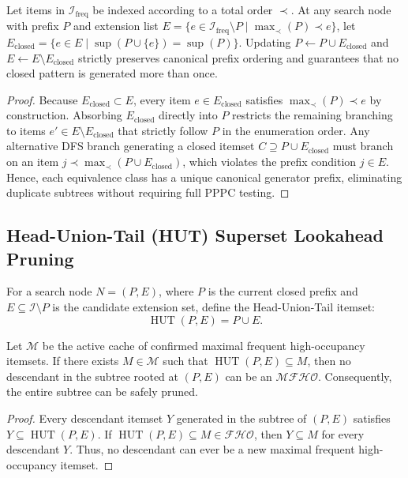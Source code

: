 \documentclass[runningheads,orivec]{llncs}
\newcommand{\supp}{\operatorname{sup}}
\newcommand{\HUT}{\operatorname{HUT}}
\newcommand{\FHO}{\ensuremath{\mathcal{FHO}}}
\newcommand{\MFHOI}{\ensuremath{\mathcal{MFHO}}}
\begin{document}
\begin{lemma}
\label{lem:canonical_closure}
Let items in $\mathcal{I}_{\text{freq}}$ be indexed according to a total order $\prec$.
At any search node with prefix $P$ and extension list $E = \{e \in \mathcal{I}_{\text{freq}} \setminus P \mid \max_{\prec}(P) \prec e\}$, let $E_{\mathrm{closed}} = \{e \in E \mid \supp(P \cup \{e\}) = \supp(P)\}$.
Updating $P \gets P \cup E_{\mathrm{closed}}$ and $E \gets E \setminus E_{\mathrm{closed}}$ strictly preserves canonical prefix ordering and guarantees that no closed pattern is generated more than once.
\end{lemma}
\begin{proof}
Because $E_{\mathrm{closed}} \subset E$, every item $e \in E_{\mathrm{closed}}$ satisfies $\max_{\prec}(P) \prec e$ by construction.
Absorbing $E_{\mathrm{closed}}$ directly into $P$ restricts the remaining branching to items $e' \in E \setminus E_{\mathrm{closed}}$ that strictly follow $P$ in the enumeration order.
Any alternative DFS branch generating a closed itemset $C \supseteq P \cup E_{\mathrm{closed}}$ must branch on an item $j \prec \max_{\prec}(P \cup E_{\mathrm{closed}})$, which violates the prefix condition $j \in E$.
Hence, each equivalence class has a unique canonical generator prefix, eliminating duplicate subtrees without requiring full PPPC testing.
\end{proof}

\subsection{Head-Union-Tail (HUT) Superset Lookahead Pruning}

For a search node $N = (P, E)$, where $P$ is the current closed prefix and $E \subseteq \mathcal{I} \setminus P$ is the candidate extension set, define the Head-Union-Tail itemset:
\begin{equation}
\HUT(P, E) = P \cup E.
\end{equation}

\begin{theorem}
\label{thm:hut_prune}
Let $\mathcal{M}$ be the active cache of confirmed maximal frequent high-occupancy itemsets. If there exists $M \in \mathcal{M}$ such that $\HUT(P, E) \subseteq M$, then no descendant in the subtree rooted at $(P, E)$ can be an $\MFHOI$. Consequently, the entire subtree can be safely pruned.
\end{theorem}
\begin{proof}
Every descendant itemset $Y$ generated in the subtree of $(P, E)$ satisfies $Y \subseteq \HUT(P, E)$.
If $\HUT(P, E) \subseteq M \in \FHO$, then $Y \subseteq M$ for every descendant $Y$. Thus, no descendant can ever be a new maximal frequent high-occupancy itemset.
\end{proof}
\end{document}
